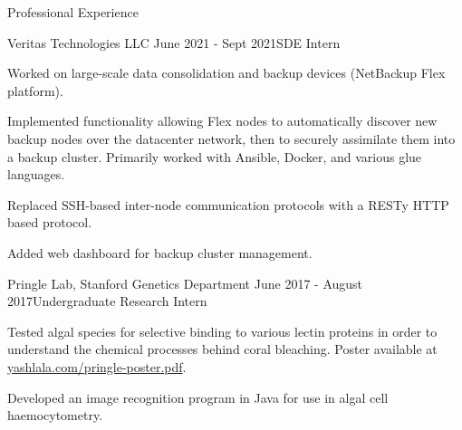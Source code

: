 \documentclass{resume} %
\begin{document}
\begin{resumeSection}{Professional Experience}
\begin{resumeSubsection}{Veritas Technologies LLC}
	{June 2021 - Sept 2021}{SDE Intern}{}
\item Worked on large-scale data consolidation and backup devices (NetBackup
	Flex platform). 
\item Implemented functionality allowing Flex nodes to automatically discover
	new backup nodes over the datacenter network, then to securely
	assimilate them into a backup cluster. Primarily worked with
	Ansible, Docker, and various glue languages. 
\item Replaced SSH-based inter-node communication protocols with a RESTy HTTP
	based protocol. 
\item Added web dashboard for backup cluster management. 
\end{resumeSubsection}

\begin{resumeSubsection}{Pringle Lab, Stanford Genetics Department}
	{June 2017 - August 2017}{Undergraduate Research Intern}{}
\item Tested algal species for selective binding to various lectin proteins in
	order to understand the chemical processes behind coral bleaching.
	Poster available at
	\href{https://yashlala.com/pringle-poster.pdf}{yashlala.com/pringle-poster.pdf}. 
\item Developed an image recognition program in Java for use in
	algal cell haemocytometry.
\end{resumeSubsection}

\end{resumeSection}
\end{document}
